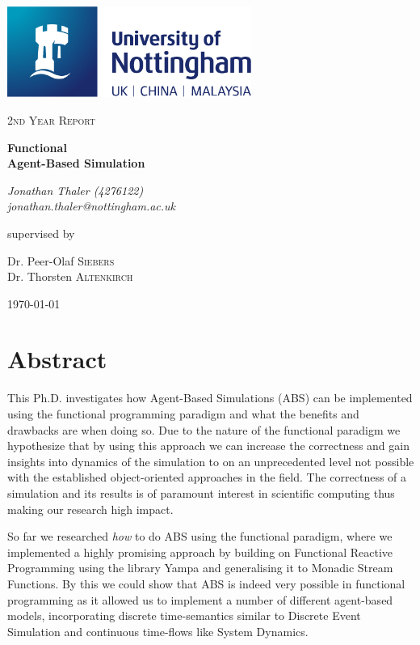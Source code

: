 \documentclass[oneside]{book}
\begin{document}
\begin{titlepage}
	\centering
	\includegraphics[width=0.60\textwidth]{./logo/UoN_Primary_Logo_RGB.png}\par\vspace{1cm}
	{\scshape\Large 2nd Year Report\par}
	\vspace{1.5cm}
	{\huge\bfseries Functional \\ Agent-Based Simulation\par}
	\vspace{2cm}
	{\Large\itshape Jonathan Thaler (4276122) \\ jonathan.thaler@nottingham.ac.uk \par}
	\vfill
	supervised by\par
	Dr. Peer-Olaf \textsc{Siebers} \\
	Dr. Thorsten \textsc{Altenkirch}

	\vfill

	{\large \today\par}
\end{titlepage}

\cleardoublepage

\section*{Abstract}
This Ph.D. investigates how Agent-Based Simulations (ABS) can be implemented using the functional programming paradigm and what the benefits and drawbacks are when doing so. Due to the nature of the functional paradigm we hypothesize that by using this approach we can increase the correctness and gain insights into dynamics of the simulation to on an unprecedented level not possible with the established object-oriented approaches in the field. The correctness of a simulation and its results is of paramount interest in scientific computing thus making our research high impact.

So far we researched \textit{how} to do ABS using the functional paradigm, where we implemented a highly promising approach by building on Functional Reactive Programming using the library Yampa and generalising it to Monadic Stream Functions. By this we could show that ABS is indeed very possible in functional programming as it allowed us to implement a number of different agent-based models, incorporating discrete time-semantics similar to Discrete Event Simulation and continuous time-flows like System Dynamics.
\end{document}
